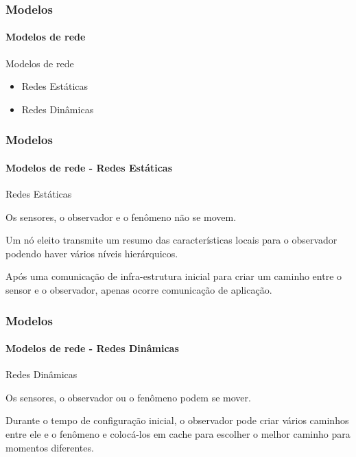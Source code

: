 \documentclass[notes]{beamer}
\begin{document}
\begin{frame}
\label{slide_63}
\frametitle{Modelos}
\framesubtitle{Modelos de rede}

\begin{block}{Modelos de rede}

\begin{itemize}

\item Redes Estáticas \pause
\item Redes Dinâmicas

\end{itemize}

\end{block}

\end{frame}

\begin{frame}
\label{slide_64}
\frametitle{Modelos}
\framesubtitle{Modelos de rede - Redes Estáticas}

\begin{block}{Redes Estáticas}

Os sensores, o observador e o fenômeno não se movem.

\end{block} \pause

\begin{block}

Um nó eleito transmite um resumo das características locais para o observador podendo haver vários níveis hierárquicos. 

\end{block} \pause

\begin{block}

Após uma comunicação de infra-estrutura inicial para criar um caminho entre o sensor e o observador, apenas ocorre comunicação de aplicação. 

\end{block}

\end{frame}

\begin{frame}
\label{slide_65}
\frametitle{Modelos}
\framesubtitle{Modelos de rede - Redes Dinâmicas}

\begin{block}{Redes Dinâmicas}

Os sensores, o observador ou o fenômeno podem se mover.

\end{block} \pause

\begin{block}

Durante o tempo de configuração inicial, o observador pode criar vários caminhos entre ele e o fenômeno e colocá-los em cache para escolher o melhor caminho para momentos diferentes.  

\end{block}

\end{frame}
\end{document}
